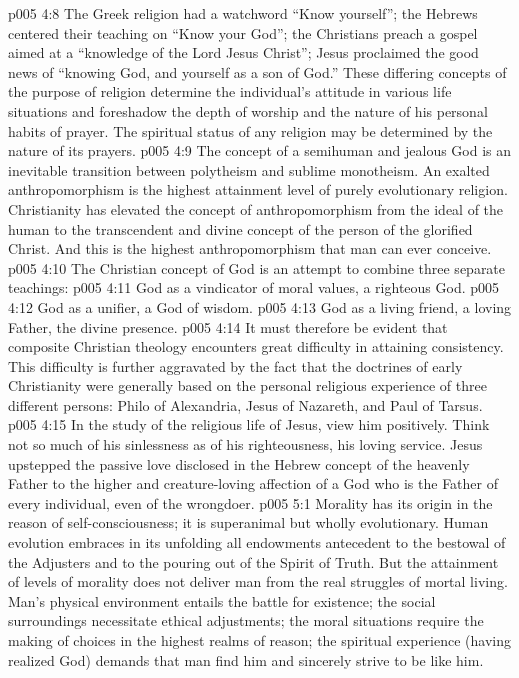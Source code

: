 \vs p005 4:8 The Greek religion had a watchword “Know yourself”; the Hebrews centered their teaching on “Know your God”; the Christians preach a gospel aimed at a “knowledge of the Lord Jesus Christ”; Jesus proclaimed the good news of \textcolor{ubdarkred}{“knowing God, and yourself as a son of God.”} These differing concepts of the purpose of religion determine the individual’s attitude in various life situations and foreshadow the depth of worship and the nature of his personal habits of prayer. The spiritual status of any religion may be determined by the nature of its prayers.
\vs p005 4:9 \pc The concept of a semihuman and jealous God is an inevitable transition between polytheism and sublime monotheism. An exalted anthropomorphism is the highest attainment level of purely evolutionary religion. Christianity has elevated the concept of anthropomorphism from the ideal of the human to the transcendent and divine concept of the person of the glorified Christ. And this is the highest anthropomorphism that man can ever conceive.
\vs p005 4:10 \pc The Christian concept of God is an attempt to combine three separate teachings:
\vs p005 4:11 \bibnobreakspace {} God as a vindicator of moral values, a righteous God.
\vs p005 4:12 \bibnobreakspace {} God as a unifier, a God of wisdom.
\vs p005 4:13 \bibnobreakspace {} God as a living friend, a loving Father, the divine presence.
\vs p005 4:14 \pc It must therefore be evident that composite Christian theology encounters great difficulty in attaining consistency. This difficulty is further aggravated by the fact that the doctrines of early Christianity were generally based on the personal religious experience of three different persons: Philo of Alexandria, Jesus of Nazareth, and Paul of Tarsus.
\vs p005 4:15 \pc In the study of the religious life of Jesus, view him positively. Think not so much of his sinlessness as of his righteousness, his loving service. Jesus upstepped the passive love disclosed in the Hebrew concept of the heavenly Father to the higher  and creature\hyp{}loving affection of a God who is the Father of every individual, even of the wrongdoer.
\vs p005 5:1 Morality has its origin in the reason of self\hyp{}consciousness; it is superanimal but wholly evolutionary. Human evolution embraces in its unfolding all endowments antecedent to the bestowal of the Adjusters and to the pouring out of the Spirit of Truth. But the attainment of levels of morality does not deliver man from the real struggles of mortal living. Man’s physical environment entails the battle for existence; the social surroundings necessitate ethical adjustments; the moral situations require the making of choices in the highest realms of reason; the spiritual experience (having realized God) demands that man find him and sincerely strive to be like him.
